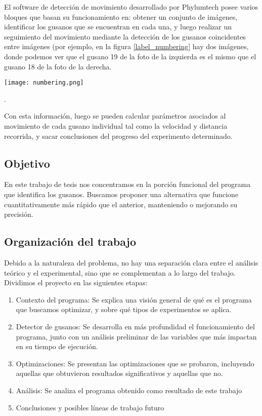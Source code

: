 \documentclass{article}
\begin{document}
El software de detección de movimiento desarrollado por Phylumtech posee varios bloques que basan su funcionamiento en: obtener un conjunto de imágenes, identificar los gusanos que se
encuentran en cada una, y luego realizar un seguimiento del movimiento mediante la detección de los gusanos coincidentes entre imágenes (por ejemplo, en la figura \ref{label_numbering} hay dos imágenes, donde podemos ver que el gusano 19 de la foto de la izquierda es el mismo que el gusano 18 de la foto de la derecha.

\begin{figure*}[h]
    \centering
    \texttt{[image: numbering.png]}
    \caption{Enumeración de gusanos}
    \label{label_numbering}
\end{figure*}.

Con esta información, luego se pueden calcular parámetros asociados al movimiento de cada gusano individual tal como la velocidad y distancia recorrida, y sacar conclusiones del progreso del experimento determinado.

\subsection{Objetivo}

En este trabajo de tesis nos concentramos en la porción funcional del programa que identifica los gusanos. Buscamos proponer una alternativa que funcione cuantitativamente más rápido que el anterior, manteniendo o mejorando su precisión.

\subsection{Organización del trabajo}
Debido a la naturaleza del problema, no hay una separación clara entre el análisis teórico y el experimental, sino que se complementan a lo largo del trabajo. Dividimos el proyecto en las siguientes etapas:
\begin{enumerate}
\item Contexto del programa: Se explica una visión general de qué es el programa que buscamos optimizar, y sobre qué tipos de experimentos se aplica.
\item Detector de gusanos: Se desarrolla en más profundidad el funcionamiento del programa, junto con un análisis preliminar de las variables que más impactan en su tiempo de ejecución.
\item Optimizaciones: Se presentan las optimizaciones que se probaron, incluyendo aquellas que obtuvieron resultados significativos y aquellas que no.
\item Análisis: Se analiza el programa obtenido como resultado de este trabajo
\item Conclusiones y posibles líneas de trabajo futuro
\end{enumerate}
\end{document}
